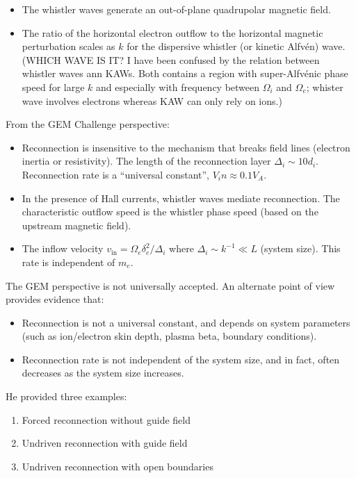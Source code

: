 \documentclass[
  notoc %
]{tufte-book}
\providecommand{\tightlist}{%
  \setlength{\itemsep}{0pt}\setlength{\parskip}{0pt}
}
\begin{document}
\begin{itemize}
\tightlist
\item
  The whistler waves generate an out-of-plane quadrupolar magnetic
  field.
\item
  The ratio of the horizontal electron outflow to the horizontal
  magnetic perturbation scales as \(k\) for the dispersive whistler (or
  kinetic Alfvén) wave. (WHICH WAVE IS IT? I have been confused by the
  relation between whistler waves ann KAWs. Both contains a region with
  super-Alfvénic phase speed for large \(k\) and especially with
  frequency between \(\Omega_i\) and \(\Omega_e\); whister wave involves
  electrons whereas KAW can only rely on ions.)
\end{itemize}

From the GEM Challenge perspective:

\begin{itemize}
\tightlist
\item
  Reconnection is insensitive to the mechanism that breaks field lines
  (electron inertia or resistivity). The length of the reconnection
  layer \(\Delta_i\sim 10 d_i\). Reconnection rate is a ``universal
  constant'', \(V_in\approx 0.1 V_A\).
\item
  In the presence of Hall currents, whistler waves mediate reconnection.
  The characteristic outflow speed is the whistler phase speed (based on
  the upstream magnetic field).
\item
  The inflow velocity \(v_\text{in}=\Omega_e\delta_e^2/\Delta_i\) where
  \(\Delta_i\sim k^{-1}\ll L\) (system size). This rate is independent
  of \(m_e\).
\end{itemize}

The GEM perspective is not universally accepted. An alternate point of
view provides evidence that:

\begin{itemize}
\tightlist
\item
  Reconnection is not a universal constant, and depends on system
  parameters (such as ion/electron skin depth, plasma beta, boundary
  conditions).
\item
  Reconnection rate is not independent of the system size, and in fact,
  often decreases as the system size increases.
\end{itemize}

He provided three examples:

\begin{enumerate}
\def\labelenumi{\arabic{enumi}.}
\tightlist
\item
  Forced reconnection without guide field
\item
  Undriven reconnection with guide field
\item
  Undriven reconnection with open boundaries
\end{enumerate}
\end{document}

